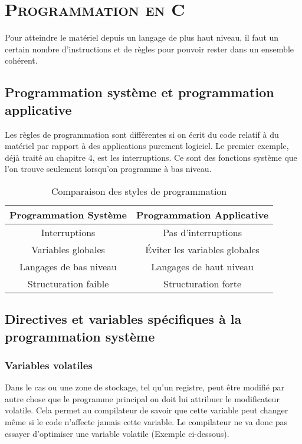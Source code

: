 \chapter{\textsc{Programmation en C}}
Pour atteindre le matériel depuis un langage de plus haut niveau, il faut un certain nombre d'instructions et de règles pour pouvoir rester dans un ensemble cohérent.


\section{Programmation système et programmation applicative}
Les règles de programmation sont différentes si on écrit du code relatif à du matériel par rapport à des applications purement logiciel. Le premier exemple, déjà traité au chapitre 4, est les interruptions. Ce sont des fonctions système que l'on trouve seulement lorsqu'on programme à bas niveau. 

\begin{table}[!htbp]
\begin{center}
{\selectfont
\begin{tabular}{|c|c|}
\hline 
Programmation Système & Programmation Applicative \\
\hline  
\hline 
Interruptions & Pas d'interruptions \\
\hline 
Variables globales & Éviter les variables globales\\
\hline
Langages de bas niveau & Langages de haut niveau\\
\hline
Structuration faible & Structuration forte\\
\hline
\end{tabular}
}
\end{center}
\caption{Comparaison des styles de programmation \label{prog}}
\end{table}

\section{Directives et variables spécifiques à la programmation système}

\subsection{Variables volatiles}
Dans le cas ou une zone de stockage, tel qu'un registre, peut être modifié par autre chose que le programme principal on doit lui attribuer le modificateur volatile. Cela permet au compilateur de savoir que cette variable peut changer même si le code n'affecte jamais cette variable. Le compilateur ne va donc pas essayer d'optimiser une variable volatile (Exemple ci-dessous). 

